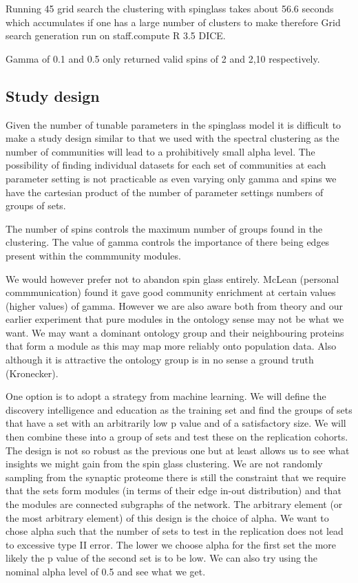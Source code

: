 Running 45 grid search the clustering with spinglass takes about 56.6 seconds which accumulates if one has a large number of clusters to make therefore Grid search generation run on staff.compute R 3.5 DICE.

Gamma of 0.1 and 0.5 only returned valid spins of 2 and 2,10 respectively. 
\subsection{Study design}
Given the number of tunable parameters in the spinglass model it is difficult to make a study design similar to that we used with the spectral clustering as the number of communities will lead to a prohibitively small alpha level. The possibility of finding individual datasets for each set of communities at each parameter setting is not practicable as even varying only gamma and spins we have the cartesian product of the number of parameter settings numbers of groups of sets.

The number of spins controls the maximum number of groups found in the clustering. The value of gamma controls the importance of there being edges present within the commmunity modules.

We would however prefer not to abandon spin glass entirely. McLean (personal commmunication) found it gave good community enrichment at certain values (higher values) of gamma. However we are also aware both from theory and our earlier experiment that pure modules in the ontology sense may not be what we want. We may want a dominant ontology group and their neighbouring proteins that form a module as this may map more reliably onto population data. Also although it is attractive the ontology group is in no sense a ground truth  (Kronecker).

One option is to adopt a strategy from machine learning. We will define the discovery intelligence and education as the training set and find the groups of sets that have a set with an arbitrarily low p value and of a satisfactory size. We will then combine these into a group of sets and test these on the replication cohorts. The design is not so robust as the previous one but at least allows us to see what insights we might gain from the spin glass clustering. We are not randomly sampling from the synaptic proteome there is still the constraint that we require that the sets form modules (in terms of their edge in-out distribution) and that the modules are connected subgraphs of the network. The arbitrary element (or the most arbitrary element) of this design is the choice of alpha. We want to chose alpha such that the number of sets to test in the replication does not lead to excessive type II error. The lower we choose alpha for the first set the more likely the p value of the second set is to be low. We can also try using the nominal alpha level of 0.5 and see what we get. 

